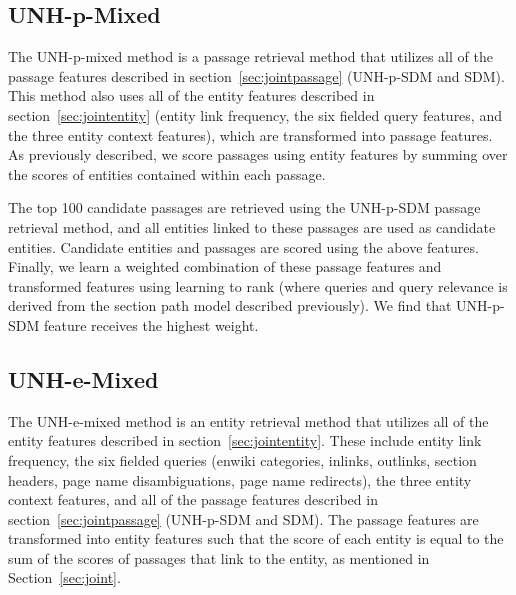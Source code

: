 \documentclass{article}
\begin{document}







\subsection{UNH-p-Mixed}\label{sec:pmixed}

The UNH-p-mixed method is a passage retrieval method that utilizes all of the passage features described in section~\ref{sec:jointpassage} (UNH-p-SDM and SDM). This method also uses all of the entity features described in section~\ref{sec:jointentity} (entity link frequency, the six fielded query features, and the three entity context features), which are transformed into passage features. As previously described, we score passages using entity features by summing over the scores of entities contained within each passage.  

The top 100 candidate passages are retrieved using the UNH-p-SDM passage retrieval method, and all entities linked to these passages are used as candidate entities. Candidate entities and passages are scored using the above features. Finally, we learn a weighted combination of these passage features and transformed features using learning to rank (where queries and query relevance is derived from the section path model described previously). We find that UNH-p-SDM feature receives the highest weight.



\subsection{UNH-e-Mixed}\label{sec:emixed}

The UNH-e-mixed method is an entity retrieval method that utilizes all of the entity features described in section~\ref{sec:jointentity}. These include entity link frequency, the six fielded queries (enwiki categories, inlinks, outlinks, section headers, page name disambiguations, page name redirects), the three entity context features, and all of the passage features described in section~\ref{sec:jointpassage} (UNH-p-SDM and SDM). The passage features are transformed into entity features such that the score of each entity is equal to the sum of the scores of passages that link to the entity, as mentioned in Section~\ref{sec:joint}.
\end{document}
